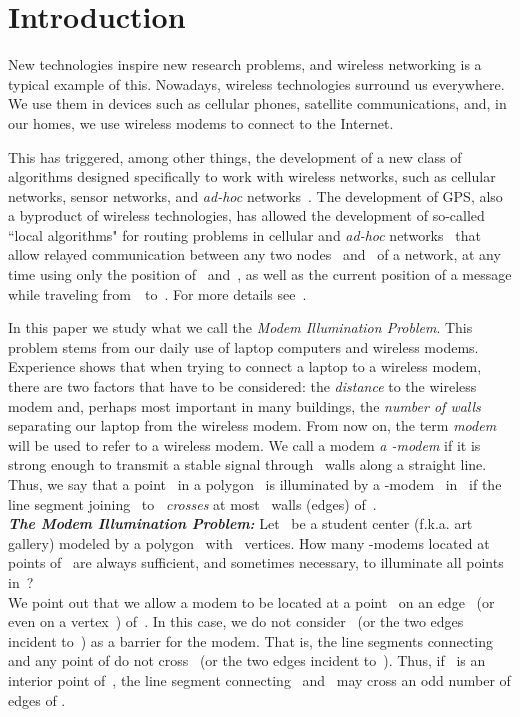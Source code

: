 \documentclass[A4]{article}
\begin{document}
\section{Introduction}

New technologies inspire new research problems, and wireless networking is a typical example of this.
Nowadays, wireless technologies surround us everywhere.
We use them in devices such as cellular phones, satellite communications, and, in our homes, we use wireless modems to connect to the Internet.

This has triggered, among other things, the development of a new class of algorithms designed specifically to work with wireless networks, such as cellular networks, sensor networks, and \emph{ad-hoc} networks~\cite{Kran2,Urrutia2,Watten}.
The development of GPS, also a byproduct of wireless technologies, has allowed the development of so-called ``local algorithms" for routing problems in cellular and \emph{ad-hoc} networks~\cite{BMSU,Krana,Urrutia2} that allow relayed communication between any two nodes ~and~ of a network, at any time using  only the position of ~and~, as well as the current position of a message while traveling from~~to~.
For more details see~\cite{Urrutia2,Watten}.

In this paper we study what we call the \emph{Modem Illumination Problem}.
This problem stems from our daily use of laptop computers and wireless modems.
Experience shows that when trying to connect a laptop to a wireless modem, there are two factors that have to be considered: the \emph{distance} to the wireless modem and, perhaps most important in many buildings, the \emph{number of walls} separating our laptop from the wireless modem.
From now on, the term \emph{modem} will be used to refer to a wireless modem.
We call a modem \emph{a -modem} if it is strong enough to transmit a stable signal through~ walls along a straight line.
Thus, we say that a point~ in a polygon~ is illuminated by a \mbox{-modem}~ in~ if the line segment joining~ to~ \emph{crosses} at most~ walls (edges) of~.\\

\noindent \emph{\bf{The Modem Illumination Problem}: }
Let~ be a student center (f.k.a. art gallery) modeled by a polygon~ with~ vertices.
How many \mbox{-modems} located at points of~ are always sufficient, and sometimes necessary, to illuminate all points in~?\\

We point out that we allow a modem to be located at a point~ on an edge~ (or even on a vertex~) of~.
In this case, we do not consider~ (or the two edges incident to~) as a barrier for the modem.
That is, the line segments connecting~ and any point of  do not cross~ (or the two edges incident to~).
Thus, if~ is an interior point of~, the line segment connecting~ and~ may cross an odd number of edges of .
\end{document}
